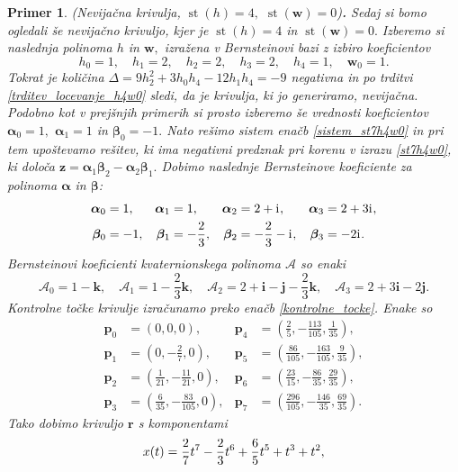 \documentclass[12pt,a4paper,twoside]{article}
\newcommand{\iu}{\mathrm{i}\mkern1mu} %
\theoremstyle{definition} %
\theoremstyle{plain} %
\theoremstyle{primerstyle}
\newtheorem{primer}[definicija]{Primer}
\numberwithin{equation}{section}  %
\newcommand{\pV}{\mathbf{p}}
\newcommand{\rV}{\mathbf{r}}
\newcommand{\iV}{\mathbf{i}}
\newcommand{\jV}{\mathbf{j}}
\newcommand{\kV}{\mathbf{k}}
\newcommand{\wV}{\mathbf{w}}
\newcommand{\zV}{\mathbf{z}}
\newcommand{\AQ}{\mathcal{A}}
\newcommand{\balpha}{\boldsymbol \alpha}
\newcommand{\bbeta}{\boldsymbol \beta}
\DeclareMathOperator{\st}{st}
\begin{document}
\begin{primer}
	\label{primer_h4w0_nevijacna}
	\textnormal{ }(Nevijačna krivulja, $\st(h)=4,$ $\st(\wV)=0$)\textbf{.}
	Sedaj si bomo ogledali še nevijačno krivuljo, kjer je $\st(h)=4$ in $\st(\wV)=0.$ Izberemo si naslednja polinoma $h$ in $\wV,$ izražena v Bernsteinovi bazi z izbiro koeficientov
	\begin{equation*}
		h_0=1,\quad h_1=2,\quad h_2=2,\quad h_3=2,\quad h_4=1,\quad \wV_0=1.
	\end{equation*}
	Tokrat je količina $\Delta=9h_2^2+3h_0h_4-12h_1h_4=-9$ negativna in po trditvi \ref{trditev_locevanje_h4w0} sledi, da je krivulja, ki jo generiramo, nevijačna. Podobno kot v prejšnjih primerih si prosto izberemo še vrednosti koeficientov $\balpha_0=1,$ $\balpha_1=1$ in $\bbeta_0=-1.$ Nato rešimo sistem enačb \eqref{sistem_st7h4w0} in pri tem upoštevamo rešitev, ki ima negativni predznak pri korenu v izrazu \eqref{st7h4w0}, ki določa $\zV=\balpha_1\bbeta_2-\balpha_2\bbeta_1.$ Dobimo naslednje Bernsteinove koeficiente za polinoma $\balpha$ in $\bbeta$:
	\begin{align*}
		\balpha_0&=1,&\balpha_1&=1,&\balpha_2&=2+\iu,&\balpha_3&=2+3\iu,\\
		\bbeta_0&=-1,&\bbeta_1&=-\frac{2}{3},&\bbeta_2&=-\frac{2}{3}-\iu,&\bbeta_3&=-2\iu.
	\end{align*}
	Bernsteinovi koeficienti kvaternionskega polinoma $\AQ$ so enaki
	\begin{equation*}
		\AQ_0=1-\kV,\quad\AQ_1=1-\frac{2}{3}\kV,\quad\AQ_2=2+\iV-\jV-\frac{2}{3}\kV,\quad\AQ_3=2+3\iV-2\jV.
	\end{equation*}
	Kontrolne točke krivulje izračunamo preko enačb \eqref{kontrolne_tocke}. Enake so
	\begin{align*}
		\pV_0&=(0,0,0),&\pV_4&=\left(\frac{2}{5},-\frac{113}{105},\frac{1}{35}\right),\\
		\pV_1&=\left(0,-\frac{2}{7},0\right),&\pV_5&=\left(\frac{86}{105},-\frac{163}{105},\frac{9}{35}\right),\\
		\pV_2&=\left(\frac{1}{21},-\frac{11}{21},0\right),&\pV_6&=\left(\frac{23}{15},-\frac{86}{35},\frac{29}{35}\right),\\
		\pV_3&=\left(\frac{6}{35},-\frac{83}{105},0\right),&\pV_7&=\left(\frac{296}{105},-\frac{146}{35},\frac{69}{35}\right).
	\end{align*}
	Tako dobimo krivuljo $\rV$ s komponentami
	\begin{align}
		x(t)&=\frac{2}{7}t^7-\frac{2}{3}t^6+\frac{6}{5}t^5+t^3+t^2,\notag\\

\end{align}
\end{primer}
\end{document}
